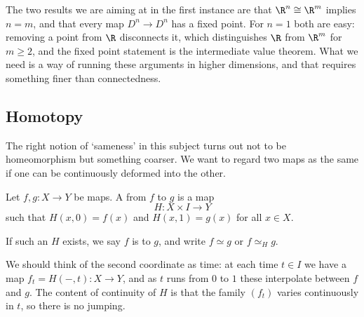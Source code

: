 The two results we are aiming at in the first instance are that $\R^n \cong \R^m$ implies
$n = m$, and that every map $D^n \to D^n$ has a fixed point. For $n = 1$ both are easy:
removing a point from $\R$ disconnects it, which distinguishes $\R$ from $\R^m$ for
$m \geq 2$, and the fixed point statement is the intermediate value theorem. What we need
is a way of running these arguments in higher dimensions, and that requires something
finer than connectedness.

\subsection{Homotopy}

The right notion of `sameness' in this subject turns out not to be homeomorphism but
something coarser. We want to regard two maps as the same if one can be continuously
deformed into the other.

\begin{definition}[Homotopy]
	Let $f, g: X \rightarrow Y$ be maps. A  from $f$ to $g$ is a map
	$$
	H: X \times I \rightarrow Y
	$$
	such that $H(x, 0)=f(x)$ and $H(x, 1)=g(x)$ for all $x \in X$.

	If such an $H$ exists, we say $f$ is  to $g$, and write $f \simeq g$ or $f \simeq_H g$.
\end{definition}

We should think of the second coordinate as time: at each time $t \in I$ we have a map
$f_t = H(-, t): X \to Y$, and as $t$ runs from $0$ to $1$ these interpolate between $f$
and $g$. The content of continuity of $H$ is that the family $(f_t)$ varies continuously
in $t$, so there is no jumping.

\begin{center}
\end{center}

